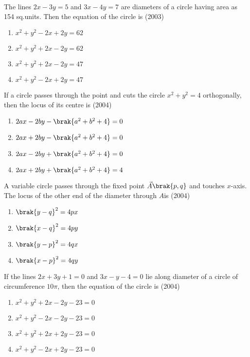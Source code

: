 \iffalse                
\title{8.circle}
\author{EE24BTECH11027-satwikagv}
\section{mains}
\fi
\item The lines $2x-3y=5$ and $3x-4y=7$ are diameters of a circle having area as 154 sq.units. Then the equation of the circle is
\hfill{(2003)}
\begin{enumerate}
\item $x^2+y^2-2x+2y=62$
\item $x^2+y^2+2x-2y=62$
\item $x^2+y^2+2x-2y=47$
\item $x^2+y^2-2x+2y=47$
\end{enumerate}
\item If a circle passes through the point  and cuts the circle $x^2+y^2=4$ orthogonally, then the locus of its centre is
\hfill{(2004)}
\begin{enumerate}
\item $2ax-2by-\brak{a^2+b^2+4}=0$
\item $2ax+2by-\brak{a^2+b^2+4}=0$
\item $2ax-2by+\brak{a^2+b^2+4}=0$
\item $2ax+2by+\brak{a^2+b^2+4}=4$
\end{enumerate}
\item A variable circle passes through the fixed point $\vec{A}\brak{p,q}$ and touches $x$-axis. The locus of the other end of the diameter through $A$is
\hfill{(2004)}
\begin{multicols}{2}
\begin{enumerate}
\item $\brak{y-q}^2=4px$
\item $\brak{x-q}^2=4py$ 
\item $\brak{y-p}^2=4qx$
\item $\brak{x-p}^2=4qy$
\end{enumerate}
\end{multicols}
\item If the lines $2x+3y+1=0$ and $3x-y-4=0$ lie along diameter of a circle of circumference $10\pi$, then the equation of the circle is 
\hfill{(2004)}
\begin{enumerate}
\item $x^2+y^2+2x-2y-23=0$
\item $x^2+y^2-2x-2y-23=0$
\item $x^2+y^2+2x+2y-23=0$
\item $x^2+y^2-2x+2y-23=0$
\end{enumerate}
